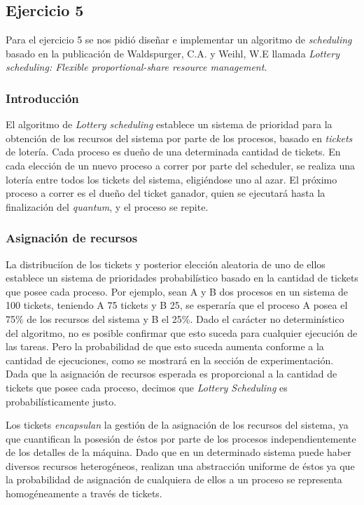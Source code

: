 \subsection{Ejercicio 5}

Para el ejercicio 5 se nos pidi\'o dise\~nar e implementar un algoritmo de \textit{scheduling} basado en la publicaci\'on de Waldspurger, C.A. y Weihl, W.E llamada \textit{Lottery scheduling: Flexible proportional-share resource management}.

\subsubsection{Introducci\'on}

El algoritmo de \textit{Lottery scheduling} establece un sistema de prioridad para la obtenci\'on de los recursos del sistema por parte de los procesos, basado en \textit{tickets} de loter\'ia. Cada proceso es due\~no de una determinada cantidad de tickets. En cada elecci\'on de un nuevo proceso a correr por parte del scheduler, se realiza una loter\'ia entre todos los tickets del sistema, eligi\'endose uno al azar. El pr\'oximo proceso a correr es el due\~no del ticket ganador, quien se ejecutar\'a hasta la finalizaci\'on del \textit{quantum}, y el proceso se repite.

\subsubsection{Asignaci\'on de recursos}

La distribuci\'ion de los tickets y posterior elecci\'on aleatoria de uno de ellos establece un sistema de prioridades probabil\'istico basado en la cantidad de tickets que posee cada proceso. Por ejemplo, sean A y B dos procesos en un sistema de 100 tickets, teniendo A 75 tickets y B 25, se esperar\'ia que el proceso A posea el 75\% de los recursos del sistema y B el 25\%. Dado el car\'acter no determin\'istico del algoritmo, no es posible confirmar que esto suceda para cualquier ejecuci\'on de las tareas. Pero la probabilidad de que esto suceda aumenta conforme a la cantidad de ejecuciones, como se mostrar\'a en la secci\'on de experimentaci\'on. Dada que la asignaci\'on de recursos esperada es proporcional a la cantidad de tickets que posee cada proceso, decimos que \textit{Lottery Scheduling} es probabil\'isticamente justo.

Los tickets \textit{encapsulan} la gesti\'on de la asignaci\'on de los recursos del sistema, ya que cuantifican la posesi\'on de \'estos por parte de los procesos independientemente de los detalles de la m\'aquina. Dado que en un determinado sistema puede haber diversos recursos heterog\'eneos, realizan una abstracci\'on uniforme de \'estos ya que la probabilidad de asignaci\'on de cualquiera de ellos a un proceso se representa homog\'eneamente a trav\'es de tickets. 

